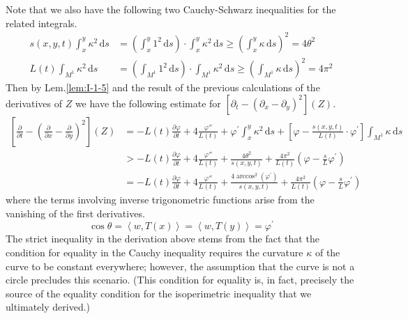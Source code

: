 Note that we also have the following two Cauchy-Schwarz inequalities for the related integrals.
\begin{align*}
    s(x,y,t)\int_{x}^{y}\kappa^2\,\mathrm{d}s&=\left(\int_{x}^{y} 1^2\,\mathrm{d}s\right)\cdot\int_{x}^{y}\kappa^2\,\mathrm{d}s\ge{\left(\int_{x}^{y}\kappa\,\mathrm{d}s\right)}^2=4\theta^2\\
L(t)\int_{M^1}\kappa^2\,\mathrm{d}s&={\left(\int_{M^1}1^2\,\mathrm{d}s\right)}\cdot\int_{M^1}\kappa^2\,\mathrm{d}s\ge{\left(\int_{M^1}\kappa\,\mathrm{d}s\right)}^2=4\pi^2
\end{align*}
Then by Lem.\ref{lem:I-1-5} and the result of the previous calculations of the derivatives of $Z$ we have the following estimate for $[\partial_t-{(\partial_x-\partial_y)}^2](Z)$.
\begin{align*}
    \left[\frac{\partial}{\partial t}-{\left(\frac{\partial}{\partial x}-\frac{\partial}{\partial y}\right)}^2\right](Z)&=-L(t)\frac{\partial\varphi}{\partial t}+4\frac{\varphi{''}}{L(t)}+\varphi^\prime\int_{x}^{y}\kappa^2\,\mathrm{d}s +\left[\varphi-\frac{s(x,y,t)}{L(t)}\cdot\varphi^\prime\right]\int_{M^1}\kappa\,\mathrm{d}s\\
    &>-L(t)\frac{\partial\varphi}{\partial t}+4\frac{\varphi{''}}{L(t)}+\frac{4\theta^2}{s(x,y,t)}+\frac{4\pi^2}{L(t)}\left(\varphi-\frac{s}{L}\varphi^\prime\right)\\
    &=-L(t)\frac{\partial\varphi}{\partial t}+4\frac{\varphi{''}}{L(t)}+\frac{4\arccos^2{(\varphi^\prime)}}{s(x,y,t)}+\frac{4\pi^2}{L(t)}\left(\varphi-\frac{s}{L}\varphi^\prime\right)
\end{align*}
where the terms involving inverse trigonometric functions arise from the vanishing of the first derivatives.
\begin{equation*}
    \cos{\theta}=\left<w,T(x)\right>=\left<w,T(y)\right>=\varphi^\prime
\end{equation*}
The strict inequality in the derivation above stems from the fact that the condition for equality in the Cauchy inequality requires the curvature $\kappa$ of the curve to be constant everywhere; however, the assumption that the curve is not a circle precludes this scenario. (This condition for equality is, in fact, precisely the source of the equality condition for the isoperimetric inequality that we ultimately derived.)

